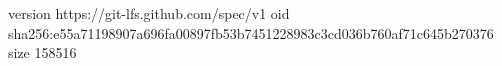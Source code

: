 version https://git-lfs.github.com/spec/v1
oid sha256:e55a71198907a696fa00897fb53b7451228983c3cd036b760af71c645b270376
size 158516
